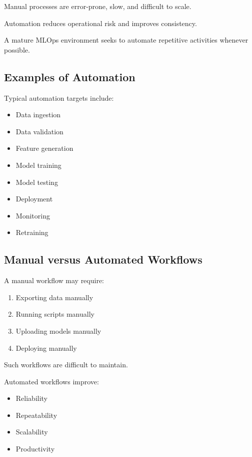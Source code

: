 Manual processes are error-prone, slow, and difficult to scale.

Automation reduces operational risk and improves consistency.

A mature MLOps environment seeks to automate repetitive activities whenever possible.

\subsection{Examples of Automation}

Typical automation targets include:

\begin{itemize}
    \item Data ingestion
    \item Data validation
    \item Feature generation
    \item Model training
    \item Model testing
    \item Deployment
    \item Monitoring
    \item Retraining
\end{itemize}

\subsection{Manual versus Automated Workflows}

A manual workflow may require:

\begin{enumerate}
    \item Exporting data manually
    \item Running scripts manually
    \item Uploading models manually
    \item Deploying manually
\end{enumerate}

Such workflows are difficult to maintain.

Automated workflows improve:

\begin{itemize}
    \item Reliability
    \item Repeatability
    \item Scalability
    \item Productivity
\end{itemize}

